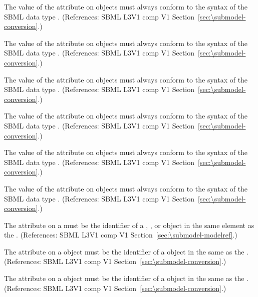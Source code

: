 \begin{sbmlenum}
 { The value of the  attribute 
  on \Submodel objects must always conform to the syntax of
  the SBML data type .
  (References: SBML L3V1 comp V1 Section~\ref{sec:\submodel-conversion}.) }


 { The value of the  attribute 
  on \Submodel objects must always conform to the syntax of
  the SBML data type .
  (References: SBML L3V1 comp V1 Section~\ref{sec:\submodel-conversion}.) }


 { The value of the  attribute 
  on \Submodel objects must always conform to the syntax of
  the SBML data type .
  (References: SBML L3V1 comp V1 Section~\ref{sec:\submodel-conversion}.) }


 { The value of the  attribute 
  on \Submodel objects must always conform to the syntax of
  the SBML data type .
  (References: SBML L3V1 comp V1 Section~\ref{sec:\submodel-conversion}.) }


 { The value of the  attribute 
  on \Submodel objects must always conform to the syntax of
  the SBML data type .
  (References: SBML L3V1 comp V1 Section~\ref{sec:\submodel-conversion}.) }


 { The value of the  attribute 
  on \Submodel objects must always conform to the syntax of
  the SBML data type .
  (References: SBML L3V1 comp V1 Section~\ref{sec:\submodel-conversion}.) }


 { The  attribute on a \Submodel must
  be the identifier of a \Model, \ModelDefinition, or
  \ExternalModelDefinition object in the same  element as the
  \Submodel. 
  (References: SBML L3V1 comp V1 Section~\ref{sec:\submodel-modelref}.) }


 { The  attribute
   on a \Submodel object must be the identifier of a \Parameter object in the 
   same \Model as the \Submodel.
  (References: SBML L3V1 comp V1 Section~\ref{sec:\submodel-conversion}.) }


 { The  attribute
   on a \Submodel object must be the identifier of a \Parameter object in the 
   same \Model as the \Submodel.
  (References: SBML L3V1 comp V1 Section~\ref{sec:\submodel-conversion}.) }



\end{sbmlenum}
